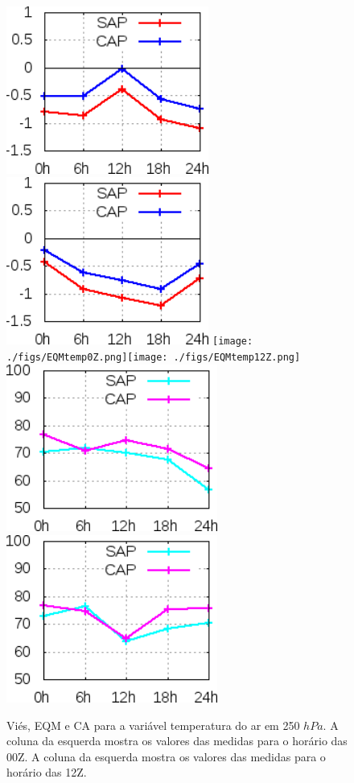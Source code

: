 \begin{figure}[!hbp]
\includegraphics[height=5.5cm]{./figs/VIES250temp0Z.png}\includegraphics[height=5.5cm]{./figs/VIES250temp12Z.png}
\texttt{[image: ./figs/EQMtemp0Z.png]}\texttt{[image: ./figs/EQMtemp12Z.png]}
\includegraphics[height=5.5cm]{./figs/CA250temp0Z.png}\includegraphics[height=5.5cm]{./figs/CA250temp12Z.png}
\caption{Viés, EQM e CA para a variável temperatura do ar em 250 $hPa$. A coluna da esquerda mostra os valores das medidas para o horário das 00Z. A coluna da esquerda mostra os valores das medidas para o horário das 12Z.}
\label{fig57}
\end{figure}
